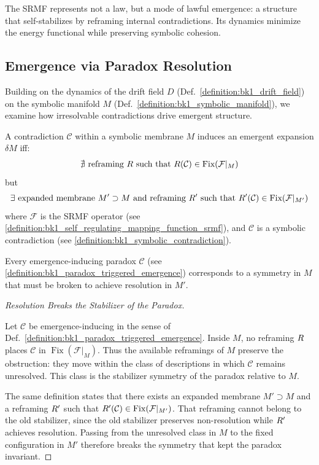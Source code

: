 \begin{remark}
The SRMF represents not a law, but a mode of lawful emergence: a structure that self-stabilizes by reframing internal contradictions. Its dynamics minimize the energy functional while preserving symbolic cohesion.
\end{remark}
\subsection{Emergence via Paradox Resolution}
\label{subsec:bk1_emergence_via_paradox_resolution}
Building on the dynamics of the drift field $D$ (Def.~\ref{definition:bk1_drift_field}) on the symbolic manifold $M$ (Def.~\ref{definition:bk1_symbolic_manifold}), we examine how irresolvable contradictions drive emergent structure.

\begin{definition}
\label{definition:bk1_paradox_triggered_emergence}
A contradiction $\mathcal{C}$ within a symbolic membrane $M$ induces an emergent expansion $\delta M$ iff:
\[
\nexists \text{ reframing } R \text{ such that } R(\mathcal{C}) \in \text{Fix}(\mathcal{F}|_M)
\]
but
\[
\exists \text{ expanded membrane } M' \supset M \text{ and reframing } R' \text{ such that } R'(\mathcal{C}) \in \text{Fix}(\mathcal{F}|_{M'})
\]
where $\mathcal{F}$ is the SRMF operator (see \ref{definition:bk1_self_regulating_mapping_function_srmf}), and $\mathcal{C}$ is a symbolic contradiction (see \ref{definition:bk1_symbolic_contradiction}).
\end{definition}

\begin{lemma}
\label{lemma:bk1_paradoxical_symmetry_breaking}
Every emergence-inducing paradox $\mathcal{C}$ (see \ref{definition:bk1_paradox_triggered_emergence}) corresponds to a symmetry in $M$ that must be broken to achieve resolution in $M'$.
\end{lemma}
\begin{proof}[Resolution Breaks the Stabilizer of the Paradox]
\label{proof:bk1_paradoxical_symmetry_breaking}
\leavevmode

Let \(\mathcal{C}\) be emergence-inducing in the sense of
Def.~\ref{definition:bk1_paradox_triggered_emergence}. Inside \(M\), no
reframing \(R\) places \(\mathcal{C}\) in
\(\operatorname{Fix}(\mathcal{F}|_M)\). Thus the available reframings of \(M\)
preserve the obstruction: they move within the class of descriptions in which
\(\mathcal{C}\) remains unresolved. This class is the stabilizer symmetry of
the paradox relative to \(M\).

The same definition states that there exists an expanded membrane
\(M'\supset M\) and a reframing \(R'\) such that
\(R'(\mathcal{C})\in\operatorname{Fix}(\mathcal{F}|_{M'})\). That
reframing cannot belong to the old stabilizer, since the old stabilizer
preserves non-resolution while \(R'\) achieves resolution. Passing from
the unresolved class in \(M\) to the fixed configuration in \(M'\) therefore
breaks the symmetry that kept the paradox invariant.
\end{proof}

